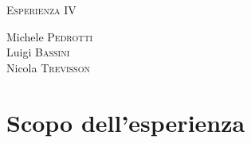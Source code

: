 \documentclass[a4paper,11pt]{article}
\begin{document}
\begin{center}



\textsc{\Huge Esperienza IV}\\[0.5cm]



\large


Michele \textsc{Pedrotti}\\
Luigi \textsc{Bassini}\\
Nicola \textsc{Trevisson}\\


\end{center}
\vspace{0.5 cm}
\section{Scopo dell'esperienza}
\end{document}

